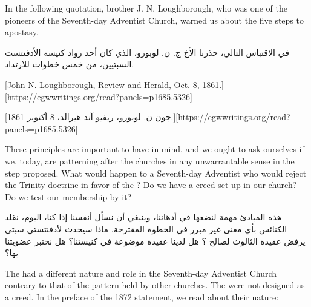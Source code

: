 



In the following quotation, brother J. N. Loughborough, who was one of the pioneers of the Seventh-day Adventist Church, warned us about the five steps to apostasy.


في الاقتباس التالي، حذرنا الأخ ج. ن. لوبورو، الذي كان أحد رواد كنيسة الأدفنتست السبتيين، من خمس خطوات للارتداد.


[John N. Loughborough, Review and Herald, Oct. 8, 1861.][https://egwwritings.org/read?panels=p1685.5326]


[جون ن. لوبورو، ريفيو آند هيرالد، 8 أكتوبر 1861.][https://egwwritings.org/read?panels=p1685.5326]


These principles are important to have in mind, and we ought to ask ourselves if we, today, are patterning after the churches in any unwarrantable sense in the step proposed. What would happen to a Seventh-day Adventist who would reject the Trinity doctrine in favor of the ? Do we have a creed set up in our church? Do we test our membership by it?


هذه المبادئ مهمة لنضعها في أذهاننا، وينبغي أن نسأل أنفسنا إذا كنا، اليوم، نقلد الكنائس بأي معنى غير مبرر في الخطوة المقترحة. ماذا سيحدث لأدفنتستي سبتي يرفض عقيدة الثالوث لصالح ؟ هل لدينا عقيدة موضوعة في كنيستنا؟ هل نختبر عضويتنا بها؟


The  had a different nature and role in the Seventh-day Adventist Church contrary to that of the pattern held by other churches. The  were not designed as a creed. In the preface of the 1872 statement, we read about their nature:


